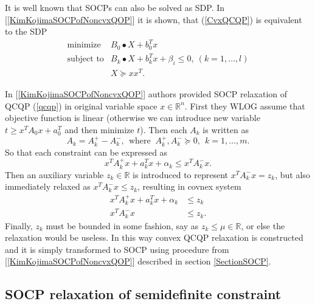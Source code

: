 \documentclass[10pt,oneside]{book}
\theoremstyle{definition}
\begin{document}
It is well known that SOCPs can also be solved as SDP. In [\ref{KimKojimaSOCPofNoncvxQOP}] it is shown, that (\ref{CvxQCQP}) is equivalent to the SDP 
\begin{equation}
\label{SDPofCvxQCQP} 
\begin{array}{ll}
\mbox{minimize}& B_0\bullet X + b_0^Tx \\
\mbox{subject to}& B_k\bullet X + b_k^Tx + \beta_i \leq 0, \  (k = 1,\dots ,l)\\
& X\succeq xx^T.
\end{array} 
\end{equation}

In [\ref{KimKojimaSOCPofNoncvxQOP}] authors provided SOCP relaxation of QCQP (\ref{qcqp}) in original variable space $x\in \mathbb{R}^n$. First they WLOG assume that objective function is linear (otherwise we can introduce new variable $t\geq x^TA_0x + a_0^T$ and then minimize $t$). Then each $A_k$ is written as 
$$A_k=A_k^+ -A_k^-, \ \ \mbox{where } \ A_k^+, A_k^- \succeq 0, \ \ k=1,\dots ,m.$$ 
So that each constraint can be expressed as 
$$x^TA_k^+x + a_k^Tx + \alpha_k \leq x^TA_k^-x.$$
Then an auxiliary variable $z_k\in \mathbb{R}$ is introduced to represent $x^TA_k^-x = z_k$, but also immediately relaxed as $x^TA_k^-x \leq z_k$, resulting in covnex system
\begin{equation}
\begin{array}{rl}
x^TA_k^+x + a_k^Tx + \alpha_k &\leq z_k  \\
x^TA_k^-x & \leq z_k.
\end{array} 
\end{equation}
Finally, $z_k$ must be bounded in some fashion, say as $z_k\leq \mu \in \mathbb{R}$, or else the relaxation would be useless. In this way convex QCQP relaxation is constructed and it is simply transformed to SOCP using procedure from [\ref{KimKojimaSOCPofNoncvxQOP}] described in section \ref{SectionSOCP}.

\subsection{SOCP relaxation of semidefinite constraint}
\end{document}
